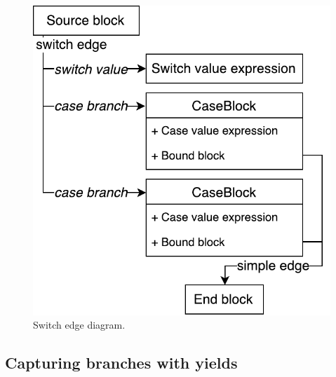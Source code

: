 \begin{figure}[h]
	\centering	
	\includegraphics[scale=0.75]{../img/5_3_switchEdge}	
	\caption{Switch edge diagram.}
	\label{fig5.3:SwitchEdge}
\end{figure}

\subsection{Capturing branches with yields}

